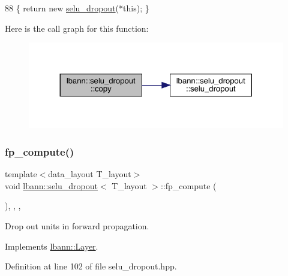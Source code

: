 \begin{DoxyCode}
88 \{ \textcolor{keywordflow}{return} \textcolor{keyword}{new} \hyperlink{classlbann_1_1selu__dropout_a988a7e6b7b85ef8ba08a2bc52537e6d3}{selu\_dropout}(*\textcolor{keyword}{this}); \}
\end{DoxyCode}
Here is the call graph for this function\+:\nopagebreak
\begin{figure}[H]
\begin{center}
\leavevmode
\includegraphics[width=324pt]{classlbann_1_1selu__dropout_a58659790298874e1dc15a45b3199db91_cgraph}
\end{center}
\end{figure}
\mbox{\label{classlbann_1_1selu__dropout_a50ccce3672873a12ae69cc76c91e767a}} 
\subsubsection{\texorpdfstring{fp\+\_\+compute()}{fp\_compute()}}
{\footnotesize\ttfamily template$<$data\+\_\+layout T\+\_\+layout$>$ \\
void \hyperlink{classlbann_1_1selu__dropout}{lbann\+::selu\+\_\+dropout}$<$ T\+\_\+layout $>$\+::fp\+\_\+compute (\begin{DoxyParamCaption}{ }\end{DoxyParamCaption})\hspace{0.3cm}{\ttfamily [inline]}, {\ttfamily [override]}, {\ttfamily [protected]}, {\ttfamily [virtual]}}

Drop out units in forward propagation. 

Implements \hyperlink{classlbann_1_1Layer_a523319dd1bd87a0612afa1912bb5aad7}{lbann\+::\+Layer}.



Definition at line 102 of file selu\+\_\+dropout.\+hpp.


